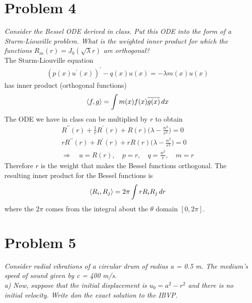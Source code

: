\documentclass[12pt]{article}
\theoremstyle{remark}
\begin{document}
\newpage

\section*{Problem 4}

\textit{Consider the Bessel ODE derived in class. Put this ODE into the form of a Sturm-Liouville problem. What is the weighted inner product for which the functions $R_m(r) = J_0(\sqrt{\lambda}r)$ are orthogonal?} \\

The Sturm-Liouville equation
\begin{align*}
	(p(x)u^\prime(x))^\prime - q(x)u(x) = -\lambda m(x)u(x)
\end{align*} 
has inner product (orthogonal functions)
\begin{align*}
	\braket{f,g} = \int m(x)f(x)\overline	{g(x)} \, dx
\end{align*}
The ODE we have in class can be multiplied by $r$ to obtain
\begin{align*}
	R^{\prime\prime}(r) + \frac{1}{r}R^{\prime}(r) + R(r)\bigg(\lambda - \frac{n^2}{r^2}\bigg) = 0 \\
	rR^{\prime\prime}(r) + R^{\prime}(r) + rR(r)\bigg(\lambda - \frac{n^2}{r^2}\bigg) = 0 \tag{multiply by $r$} \\
	\Rightarrow \quad u = R(r), \quad p = r, \quad q = \frac{n^2}{r}, \quad m = r
\end{align*}
Therefore $r$ is the weight that makes the Bessel functions orthogonal. The resulting inner product for the Bessel functions is 
\begin{align*}
	\braket{R_i, R_j} = 2\pi\int rR_iR_j \, dr
\end{align*}
where the $2\pi$ comes from the integral about the $\theta$ domain $[0,2\pi]$.

\newpage

\section*{Problem 5}

\textit{Consider radial vibrations of a circular drum of radius a = 0.5 m. The medium's speed of sound given by c = 400 m/s.} \\

\textit{a) Now, suppose that the initial displacement is $u_0 = a^2 - r^2$ and there is no initial velocity. Write don the exact solution to the IBVP.} \\
\end{document}

